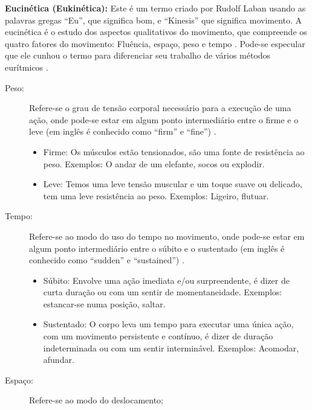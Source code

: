 \begin{tcbinformation} 
\label{ref:eukinetic}
\textbf{Eucinética (Eukinética):}
Este é um termo criado por Rudolf Laban usando as palavras gregas ``Eu'', que significa bom,
e ``Kinesis'' que significa movimento.
A eucinética é o estudo dos aspectos qualitativos do movimento,
que compreende os quatro fatores do movimento: Fluência,  espaço,  peso  e  tempo 
\cite[pp. 25-26]{elementosdanca2017} \cite[pp. 97]{maletic2011body}.
Pode-se especular que ele cunhou o termo para diferenciar seu trabalho de vários métodos eurítmicos \cite[pp. 97]{maletic2011body}.
\end{tcbinformation} 

\begin{description}
\item[Peso:]
Refere-se o grau de tensão corporal necessário para a execução de uma ação, 
onde pode-se estar em algum ponto intermediário entre o firme e o leve 
(em inglês é conhecido como   ``firm'' e ``fine'') 
\cite[pp. 137, 143]{laban1987dominio}  \cite[pp. 5]{carline2011lesson} \cite[pp. 28]{elementosdanca2017}. 
\begin{itemize}
\item Firme: Os músculos estão tensionados, são uma fonte de resistência ao peso. Exemplos: O andar de um elefante, socos ou explodir.
\item Leve: Temos uma leve tensão muscular e um toque suave ou delicado,
tem uma leve resistência ao peso.  Exemplos: Ligeiro, flutuar.
\end{itemize}
\item[Tempo:] Refere-se ao modo do uso do tempo no movimento,
onde pode-se estar em algum ponto intermediário entre o súbito e o sustentado 
(em inglês é conhecido como    ``sudden'' e ``sustained'') 
\cite[pp. 143]{laban1987dominio} \cite[pp. 5]{carline2011lesson} \cite[pp. 28]{elementosdanca2017}.
\begin{itemize}
\item Súbito: Envolve uma ação imediata e/ou surpreendente, é dizer de curta duração
ou com um sentir de momentaneidade. Exemplos: estancar-se numa posição, saltar.
\item Sustentado: O corpo leva um tempo para executar uma única ação, 
com um movimento persistente e contínuo, é dizer de duração indeterminada ou com um sentir interminável.  
Exemplos: Acomodar, afundar.
\end{itemize}
\item[Espaço:] Refere-se ao modo do deslocamento;

\end{description}
